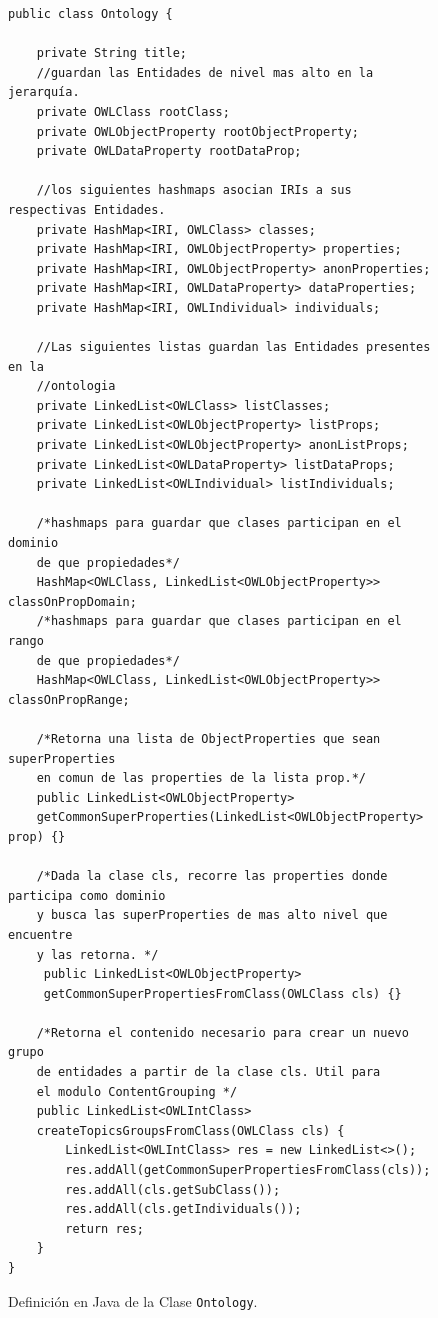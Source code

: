 \begin{figure}
\begin{verbatim}
public class Ontology {

    private String title;
    //guardan las Entidades de nivel mas alto en la jerarquía.
    private OWLClass rootClass;
    private OWLObjectProperty rootObjectProperty;
    private OWLDataProperty rootDataProp;

    //los siguientes hashmaps asocian IRIs a sus respectivas Entidades.
    private HashMap<IRI, OWLClass> classes;
    private HashMap<IRI, OWLObjectProperty> properties;
    private HashMap<IRI, OWLObjectProperty> anonProperties;
    private HashMap<IRI, OWLDataProperty> dataProperties;
    private HashMap<IRI, OWLIndividual> individuals;
    
    //Las siguientes listas guardan las Entidades presentes en la 
    //ontologia
    private LinkedList<OWLClass> listClasses;
    private LinkedList<OWLObjectProperty> listProps;
    private LinkedList<OWLObjectProperty> anonListProps;
    private LinkedList<OWLDataProperty> listDataProps;
    private LinkedList<OWLIndividual> listIndividuals;

    /*hashmaps para guardar que clases participan en el dominio
    de que propiedades*/
    HashMap<OWLClass, LinkedList<OWLObjectProperty>> classOnPropDomain;
    /*hashmaps para guardar que clases participan en el rango
    de que propiedades*/
    HashMap<OWLClass, LinkedList<OWLObjectProperty>> classOnPropRange;

    /*Retorna una lista de ObjectProperties que sean superProperties
    en comun de las properties de la lista prop.*/
    public LinkedList<OWLObjectProperty>
    getCommonSuperProperties(LinkedList<OWLObjectProperty> prop) {}

    /*Dada la clase cls, recorre las properties donde participa como dominio
    y busca las superProperties de mas alto nivel que encuentre 
    y las retorna. */
     public LinkedList<OWLObjectProperty>
     getCommonSuperPropertiesFromClass(OWLClass cls) {}

    /*Retorna el contenido necesario para crear un nuevo grupo
    de entidades a partir de la clase cls. Util para
    el modulo ContentGrouping */
    public LinkedList<OWLIntClass> 
    createTopicsGroupsFromClass(OWLClass cls) {
        LinkedList<OWLIntClass> res = new LinkedList<>();
        res.addAll(getCommonSuperPropertiesFromClass(cls));
        res.addAll(cls.getSubClass());
        res.addAll(cls.getIndividuals());
        return res;
    }
}
\end{verbatim}
\caption{Definición en Java de la Clase \texttt{Ontology}.}
\label{fig:clase_ontology}
\end{figure}


